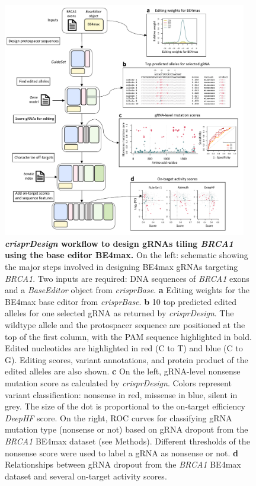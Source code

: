 \documentclass[pdftex,english,10pt]{article}
\begin{document}
{\begin{figure}
{  }
  \label{fig:rankings}
\end{figure}




\begin{figure}
\centering
\includegraphics[width=0.95\textwidth]{Figure4.pdf}
  \caption{\textbf{\textit{crisprDesign} workflow to design gRNAs tiling \textit{BRCA1} using the base editor BE4max.}
On the left: schematic showing the major steps involved in designing BE4max gRNAs targeting \textit{BRCA1}.
Two inputs are required: DNA sequences of \textit{BRCA1} exons and a 
\textit{BaseEditor} object from \textit{crisprBase}. 
   \textbf{a} Editing weights for the BE4max base editor from \textit{crisprBase}.   
   \textbf{b} 10 top predicted edited alleles for one selected gRNA as returned by \textit{crisprDesign}. The wildtype allele and the protospacer sequence are positioned at the top of the first column, with the PAM sequence highlighted in bold. Edited nucleotides are highlighted in red (C to T) and blue (C to G). Editing scores, variant annotations, and protein product of the edited alleles are also shown.
   \textbf{c} On the left, gRNA-level nonsense mutation score as calculated by \textit{crisprDesign}. Colors represent variant classification: nonsense in red, missense in blue, silent in grey. The size of the dot is proportional to the on-target efficiency \textit{DeepHF} score. On the right, ROC curves for classifying gRNA mutation type (nonsense or not) based on gRNA dropout from the \textit{BRCA1} BE4max dataset (see Methods). Different thresholds of the nonsense score were used to label a gRNA as nonsense or not.  \textbf{d} Relationships between gRNA dropout from the \textit{BRCA1} BE4max dataset and several on-target activity scores.
}
\end{figure}}
\end{document}
